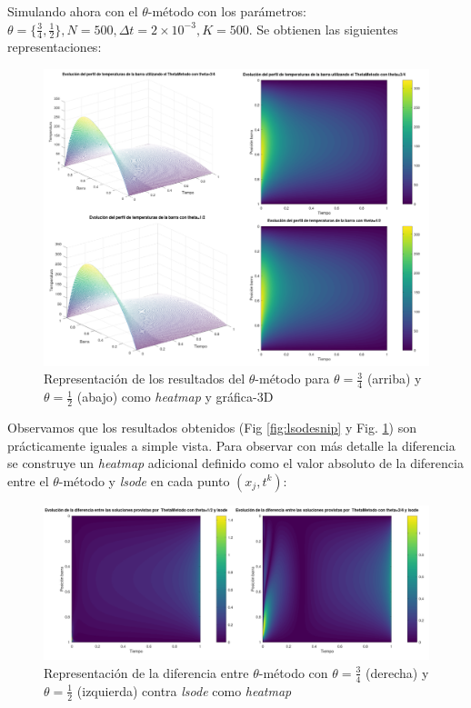 \documentclass{endm}
\begin{document}
Simulando ahora con el $\theta$-método con los parámetros: $\theta=\{\frac{3}{4},\frac{1}{2}\},N=500,\Delta t = 2\times 10^{-3},K=500$. Se obtienen las siguientes representaciones:
\begin{figure}[H]
    \centering
    \includegraphics[scale=0.65]{megasnip.PNG}
    \caption{Representación de los resultados del $\theta$-método para $\theta=\frac{3}{4}$ (arriba) y $\theta=\frac{1}{2}$ (abajo) como \textit{heatmap} y gráfica-3D}
    \label{fig:megasnip}
\end{figure} 

Observamos que los resultados obtenidos (Fig \ref{fig:lsodesnip} y Fig. \ref{fig:megasnip}) son prácticamente iguales a simple vista. Para observar con más detalle la diferencia se construye un \textit{heatmap} adicional definido como el valor absoluto de la diferencia entre el $\theta$-método y \textit{lsode} en cada punto $(x_j,t^k)$:
\begin{figure}[H]
    \centering
    \includegraphics[scale=0.45]{diffsnip.PNG}
    \caption{Representación de la diferencia entre $\theta$-método con $\theta=\frac{3}{4}$ (derecha) y $\theta=\frac{1}{2}$ (izquierda) contra \textit{lsode} como \textit{heatmap}}
    \label{fig:comp75}
\end{figure}
\end{document}
